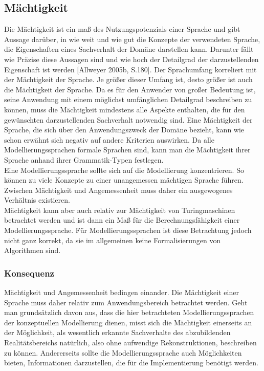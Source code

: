 \subsection{Mächtigkeit}
\label{ssc:Nutzungspotenzial}
Die Mächtigkeit ist ein maß des Nutzungspotenzials einer Sprache und gibt Aussage darüber,
in wie weit und wie gut die Konzepte der verwendeten Sprache, die Eigenschaften eines Sachverhalt der Domäne darstellen kann.
Darunter fällt wie Präzise diese Aussagen sind und wie hoch der Detailgrad der darzustellenden Eigenschaft ist werden [Allweyer 2005b, S.180].
Der Sprachumfang korreliert mit der Mächtigkeit der Sprache. Je größer dieser Umfang ist, desto größer ist auch die Mächtigkeit der Sprache.
Da es für den Anwender von großer Bedeutung ist, seine Anwendung mit einem möglichst umfänglichen Detailgrad beschreiben zu können,
muss die Mächtigkeit mindestens alle Aspekte enthalten, die für den gewünschten darzustellenden Sachverhalt notwendig sind.
Eine Mächtigkeit der Sprache, die sich über den Anwendungszweck der Domäne bezieht, kann wie schon erwähnt sich negativ auf andere Kriterien auswirken.
Da alle Modellierungssprachen formale Sprachen sind, kann man die Mächtigkeit ihrer Sprache anhand ihrer Grammatik-Typen festlegen. \\
Eine Modellierungssprache sollte sich auf die Modellierung konzentrieren.
So können zu viele Konzepte zu einer unangemessen mächtigen Sprache führen. Zwischen Mächtigkeit
und Angemessenheit muss daher ein ausgewogenes Verhältnis existieren.\\
Mächtigkeit kann aber auch relativ zur Mächtigkeit von Turingmaschinen betrachtet werden und ist
dann ein Maß für die Berechnungsfähigkeit einer Modellierungssprache. Für Modellierungssprachen
ist diese Betrachtung jedoch nicht ganz korrekt, da sie im allgemeinen keine Formalisierungen von
Algorithmen sind.

\subsubsection{Konsequenz}
Mächtigkeit und Angemessenheit bedingen einander. Die Mächtigkeit einer Sprache muss daher relativ
zum Anwendungsbereich betrachtet werden. Geht man grundsätzlich davon aus, dass die hier betrachteten
Modellierungssprachen der konzeptuellen Modellierung dienen, misst sich die Mächtigkeit einerseits
an der Möglichkeit, als wesentlich erkannte Sachverhalte des abzubildenden Realitätsbereichs
natürlich, also ohne aufwendige Rekonstruktionen, beschreiben zu können. Andererseits sollte die
Modellierungssprache auch Möglichkeiten bieten, Informationen darzustellen, die für die Implementierung
benötigt werden.


